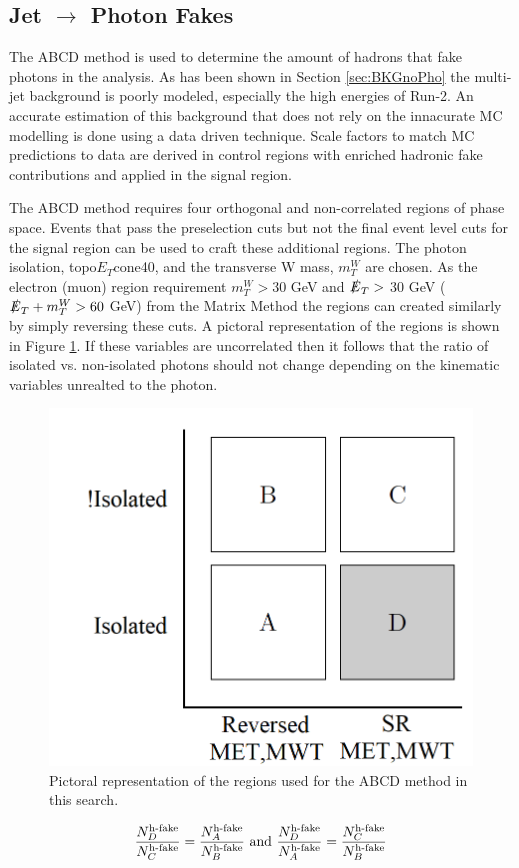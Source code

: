 \subsection{Jet $\rightarrow$ Photon Fakes}
\label{sec:FakePho2}

The ABCD method is used to determine the amount of hadrons that fake photons in the analysis.  As has been shown in Section \ref{sec:BKGnoPho} the multi-jet background is poorly modeled, especially the high energies of Run-2.  An accurate estimation of this background that does not rely on the innacurate MC modelling is done using a data driven technique.  Scale factors to match MC predictions to data are derived in control regions with enriched hadronic fake contributions and applied in the signal region. 

The ABCD method requires four orthogonal and non-correlated regions of phase space.  Events that pass the preselection cuts but not the final event level cuts for the signal region can be used to craft these additional regions.  The photon isolation,  topo$E_{T}$cone40, and the transverse W mass, $m_T^W$ are chosen.  As the electron (muon) region requirement $m_T^W > 30$ GeV and $\slashed{E}_T >$ 30 GeV ($\slashed{E}_T + m_T^W > 60$ GeV) from the Matrix Method the regions can created similarly by simply reversing these cuts.  A pictoral representation of the regions is shown in Figure \ref{fig:ABCD}.  If these variables are uncorrelated then it follows that the ratio of isolated vs. non-isolated photons should not change depending on the kinematic variables unrealted to the photon.

\begin{figure}[h!]
	\centering
	\includegraphics[width=.5\columnwidth]{../ThesisImages/SearchStrategy/ABCDpictoral.png}
	\caption{Pictoral representation of the regions used for the ABCD method in this search.}
	\label{fig:ABCD}
\end{figure}

\[\frac{N_D^{\text{h-fake}}}{N_C^{\text{h-fake}}}=\frac{N_A^{\text{h-fake}}}{N_B^{\text{h-fake}}}
\\ \text{ and } \\
\frac{N_D^{\text{h-fake}}}{N_A^{\text{h-fake}}}=\frac{N_C^{\text{h-fake}}}{N_B^{\text{h-fake}}}
\]

